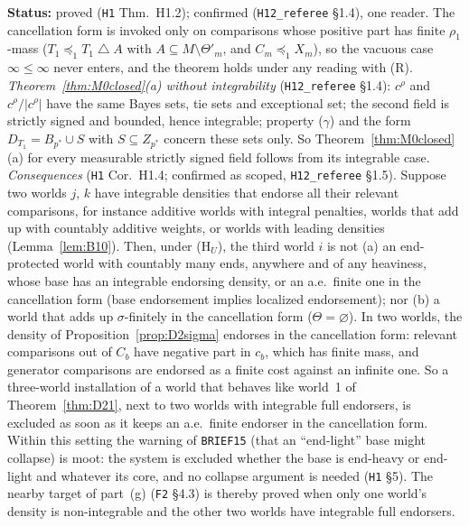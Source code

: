 \documentclass[11pt]{article}
\theoremstyle{definition}
\theoremstyle{remark}
\newcommand{\sd}{\mathbin{\triangle}}
\newcommand{\src}[1]{\texttt{#1}}
\newcommand{\status}[1]{\par\smallskip\noindent\textbf{Status:} #1\par\smallskip}
\begin{document}
\status{proved (\src{H1} Thm.~H1.2); confirmed (\src{H12\_referee} \S1.4), one reader. The cancellation form is invoked only on comparisons whose positive part has finite $\rho_1$-mass ($T_1\preceq_1T_1\sd A$ with $A\subseteq M\setminus\Theta'_m$, and $C_m\preceq_1X_m$), so the vacuous case $\infty\le\infty$ never enters, and the theorem holds under any reading with (R). \emph{Theorem~\ref{thm:M0closed}(a) without integrability} (\src{H12\_referee} \S1.4): $c^\rho$ and $c^\rho/|c^\rho|$ have the same Bayes sets, tie sets and exceptional set; the second field is strictly signed and bounded, hence integrable; property ($\gamma$) and the form $D_{T_1}=B_{p^*}\cup S$ with $S\subseteq Z_{p^*}$ concern these sets only. So Theorem~\ref{thm:M0closed}(a) for every measurable strictly signed field follows from its integrable case. \emph{Consequences} (\src{H1} Cor.~H1.4; confirmed as scoped, \src{H12\_referee} \S1.5). Suppose two worlds $j$, $k$ have integrable densities that endorse all their relevant comparisons, for instance additive worlds with integral penalties, worlds that add up with countably additive weights, or worlds with leading densities (Lemma~\ref{lem:B10}). Then, under (H$_U$), the third world $i$ is not (a) an end-protected world with countably many ends, anywhere and of any heaviness, whose base has an integrable endorsing density, or an a.e.\ finite one in the cancellation form (base endorsement implies localized endorsement); nor (b) a world that adds up $\sigma$-finitely in the cancellation form ($\Theta=\varnothing$). In two worlds, the density of Proposition~\ref{prop:D2sigma} endorses in the cancellation form: relevant comparisons out of $C_b$ have negative part in $c_b$, which has finite mass, and generator comparisons are endorsed as a finite cost against an infinite one. So a three-world installation of a world that behaves like world~1 of Theorem~\ref{thm:D21}, next to two worlds with integrable full endorsers, is excluded as soon as it keeps an a.e.\ finite endorser in the cancellation form. Within this setting the warning of \src{BRIEF15} (that an ``end-light'' base might collapse) is moot: the system is excluded whether the base is end-heavy or end-light and whatever its core, and no collapse argument is needed (\src{H1} \S5). The nearby target of part~(g) (\src{F2} \S4.3) is thereby proved when only one world's density is non-integrable and the other two worlds have integrable full endorsers.}
\end{document}
